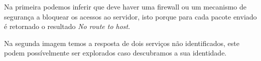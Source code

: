\par Na primeira podemos inferir que deve haver uma firewall ou um mecanismo de segurança a bloquear os acessos ao servidor, isto porque para cada pacote enviado é retornado o resultado \textit{No route to host}.\newline
\par Na segunda imagem temos a resposta de dois serviços não identificados, este podem possívelmente ser explorados caso descubramos a sua identidade.